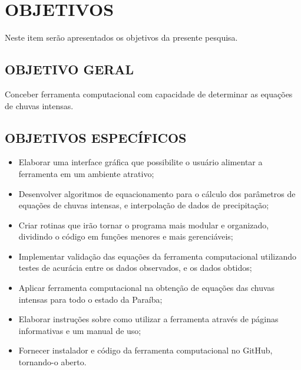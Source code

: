 \chapter{OBJETIVOS}

Neste item serão apresentados os objetivos da presente pesquisa.

\section{OBJETIVO GERAL}

Conceber ferramenta computacional com capacidade de determinar as equações de chuvas intensas. 

\section{OBJETIVOS ESPECÍFICOS}

\begin{itemize}
        \item Elaborar uma interface gráfica que possibilite o usuário alimentar a ferramenta em um ambiente atrativo;
        
        \item Desenvolver algoritmos de equacionamento para o cálculo dos parâmetros de equações de chuvas intensas, e interpolação de dados de precipitação;
        
        \item Criar rotinas que irão tornar o programa mais modular e organizado, dividindo o código em funções menores e mais gerenciáveis;
        
        \item Implementar validação das equações da ferramenta computacional utilizando testes de acurácia entre os dados observados, e os dados obtidos;
        
        \item Aplicar ferramenta computacional na obtenção de equações das chuvas intensas para todo o estado da Paraíba;
        
        \item Elaborar instruções sobre como utilizar a ferramenta através de páginas informativas e um manual de uso;

        \item Fornecer instalador e código da ferramenta computacional no GitHub, tornando-o aberto.
\end{itemize}

